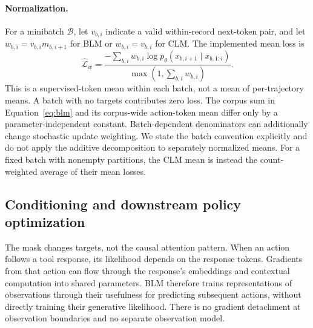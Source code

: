 \documentclass{article} %
\begin{document}
\paragraph{Normalization.}
For a minibatch $\mathcal B$, let $v_{b,i}$ indicate a valid within-record next-token pair, and let $w_{b,i}=v_{b,i}m_{b,i+1}$ for BLM or $w_{b,i}=v_{b,i}$ for CLM. The implemented mean loss is
\begin{equation}
 \widehat{\mathcal L}_{w}
 =\frac{-\sum_{b,i} w_{b,i}\log p_\theta(x_{b,i+1}\mid x_{b,1:i})}
 {\max(1,\sum_{b,i}w_{b,i})}.
 \label{eq:batch}
\end{equation}
This is a supervised-token mean within each batch, not a mean of per-trajectory means. A batch with no targets contributes zero loss. The corpus sum in Equation~\ref{eq:blm} and its corpus-wide action-token mean differ only by a parameter-independent constant. Batch-dependent denominators can additionally change stochastic update weighting. We state the batch convention explicitly and do not apply the additive decomposition to separately normalized means. For a fixed batch with nonempty partitions, the CLM mean is instead the count-weighted average of their mean losses.

\subsection{Conditioning and downstream policy optimization}
The mask changes targets, not the causal attention pattern. When an action follows a tool response, its likelihood depends on the response tokens. Gradients from that action can flow through the response's embeddings and contextual computation into shared parameters. BLM therefore trains representations of observations through their usefulness for predicting subsequent actions, without directly training their generative likelihood. There is no gradient detachment at observation boundaries and no separate observation model.
\end{document}

